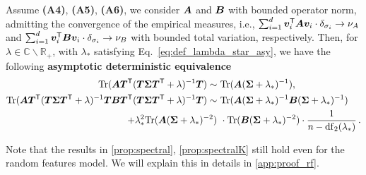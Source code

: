\begin{proposition}\citep[Restatement of Proposition 2]{bach2024high}
\label{prop:spectralK}
Assume \textbf{(A4)}, \textbf{(A5)}, \textbf{(A6)}, we consider ${\boldsymbol A}$ and ${\boldsymbol B}$ with bounded operator norm, admitting the convergence of the empirical measures, i.e., $ \sum_{i=1}^d   {\boldsymbol v}_i^{\mathsf T} {\boldsymbol A} {\boldsymbol v}_i  \cdot\delta_{\sigma_i} \rightarrow \nu_A$ and $ \sum_{i=1}^d   {\boldsymbol v}_i^{\mathsf T} {\boldsymbol B} {\boldsymbol v}_i  \cdot\delta_{\sigma_i} \rightarrow \nu_B$ with bounded total variation, respectively. Then, for $\lambda \in \mathbb{C} \backslash \mathbb{R}_+$, with $\lambda_*$ satisfying Eq.~\eqref{eq:def_lambda_star_asy}, we have the following {\bf asymptotic deterministic equivalence}
\begin{align}
\label{eq:trA1K}
{\rm Tr} ( {\boldsymbol A} {\boldsymbol T}^{\mathsf T} ( {\boldsymbol T} {\boldsymbol \Sigma} {\boldsymbol T}^{\mathsf T} + \lambda )^{-1} {\boldsymbol T}) \sim&~ {\rm Tr} ( {\boldsymbol A} ( {\boldsymbol \Sigma} + \lambda_* )^{-1} ),
\\
\label{eq:trAB1K}
{\rm Tr} ( {\boldsymbol A} {\boldsymbol T}^{\mathsf T} ( {\boldsymbol T} {\boldsymbol \Sigma} {\boldsymbol T}^{\mathsf T} + \lambda )^{-1} {\boldsymbol T} {\boldsymbol B} {\boldsymbol T}^{\mathsf T} ( {\boldsymbol T} {\boldsymbol \Sigma} {\boldsymbol T}^{\mathsf T} + \lambda )^{-1} {\boldsymbol T}) \nonumber \sim&~ {\rm Tr} ( {\boldsymbol A} ( {\boldsymbol \Sigma} + \lambda_* )^{-1} {\boldsymbol B} ( {\boldsymbol \Sigma} + \lambda_* )^{-1} )\\
+ \lambda_*^2 {\rm Tr} ( {\boldsymbol A} ( {\boldsymbol \Sigma} + \lambda_* )^{-2} )&~ \cdot {\rm Tr} ( {\boldsymbol B} ( {\boldsymbol \Sigma} + \lambda_* )^{-2} ) \cdot \frac{1}{ n -  {\rm df}_2(\lambda_*) }\,.
\end{align}
\end{proposition}

Note that the results in \cref{prop:spectral}, \ref{prop:spectralK} still hold even for the random features model.
We will explain this in details in \cref{app:proof_rf}.